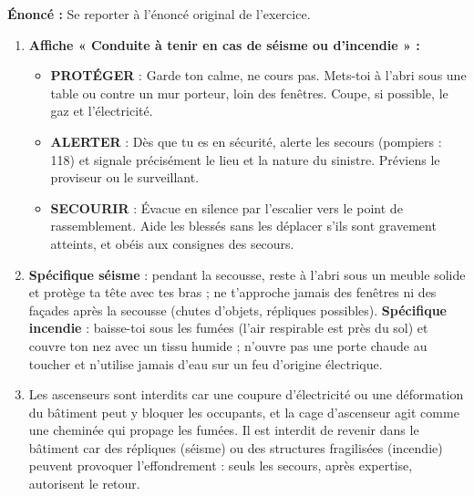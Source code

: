 \documentclass[11pt]{article}
\begin{document}
\begin{corrige}
\textbf{Énoncé :} Se reporter à l'énoncé original de l'exercice.
\tcblower
\begin{enumerate}
\item \textbf{Affiche « Conduite à tenir en cas de séisme ou d'incendie » :}
\begin{itemize}
\item \textbf{PROTÉGER} : Garde ton calme, ne cours pas. Mets-toi à l'abri sous une table ou contre un mur porteur, loin des fenêtres. Coupe, si possible, le gaz et l'électricité.
\item \textbf{ALERTER} : Dès que tu es en sécurité, alerte les secours (pompiers : 118) et signale précisément le lieu et la nature du sinistre. Préviens le proviseur ou le surveillant.
\item \textbf{SECOURIR} : Évacue en silence par l'escalier vers le point de rassemblement. Aide les blessés sans les déplacer s'ils sont gravement atteints, et obéis aux consignes des secours.
\end{itemize}
\item \textbf{Spécifique séisme} : pendant la secousse, reste à l'abri sous un meuble solide et protège ta tête avec tes bras ; ne t'approche jamais des fenêtres ni des façades après la secousse (chutes d'objets, répliques possibles). \textbf{Spécifique incendie} : baisse-toi sous les fumées (l'air respirable est près du sol) et couvre ton nez avec un tissu humide ; n'ouvre pas une porte chaude au toucher et n'utilise jamais d'eau sur un feu d'origine électrique.
\item Les ascenseurs sont interdits car une coupure d'électricité ou une déformation du bâtiment peut y bloquer les occupants, et la cage d'ascenseur agit comme une cheminée qui propage les fumées. Il est interdit de revenir dans le bâtiment car des répliques (séisme) ou des structures fragilisées (incendie) peuvent provoquer l'effondrement : seuls les secours, après expertise, autorisent le retour.
\end{enumerate}
\end{corrige}
\end{document}
